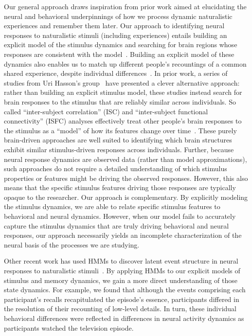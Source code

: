 \documentclass[10pt]{article}
\begin{document}
Our general approach draws inspiration from prior work aimed at elucidating the neural and behavioral underpinnings of how we process dynamic naturalistic experiences and remember them later.  Our approach to identifying neural responses to naturalistic stimuli (including experiences) entails building an explicit model of the stimulus dynamics and searching for brain regions whose responses are consistent with the model~\citep{HuthEtal12, HuthEtal16}.  Building an explicit model of these dynamics also enables us to match up different people's recountings of a common shared experience, despite individual differences~\cite{GagnEtal20}.  In prior work, a series of studies from Uri Hasson's group~\citep{LernEtal11, SimoEtal16, ChenEtal17, BaldEtal17, ZadbEtal17} have presented a clever alternative approach: rather than building an explicit stimulus model, these studies instead search for brain responses to the stimulus that are reliably similar across individuals.  So called ``inter-subject correlation'' (ISC) and ``inter-subject functional connectivity'' (ISFC) analyses effectively treat other people's brain responses to the stimulus as a ``model'' of how its features change over time~\citep{SimoChan20}.  These purely brain-driven approaches are well suited to identifying which brain structures exhibit similar stimulus-driven responses across individuals.  Further, because neural response dynamics are observed data (rather than model approximations), such approaches do not require a detailed understanding of which stimulus properties or features might be driving the observed responses.  However, this also means that the specific stimulus features driving those responses are typically opaque to the researcher.  Our approach is complementary.  By explicitly modeling the stimulus dynamics, we are able to relate specific stimulus features to behavioral and neural dynamics.  However, when our model fails to accurately capture the stimulus dynamics that are truly driving behavioral and neural responses, our approach necessarily yields an incomplete characterization of the neural basis of the processes we are studying.

Other recent work has used HMMs to discover latent event structure in neural responses to naturalistic stimuli~\citep{BaldEtal17}.  By applying HMMs to our explicit models of stimulus and memory dynamics, we gain a more direct understanding of those state dynamics.  For example, we found that although the events comprising each participant's recalls recapitulated the episode's essence, participants differed in the resolution of their recounting of low-level details.  In turn, these individual behavioral differences were reflected in differences in neural activity dynamics as participants watched the television episode.
\end{document}
